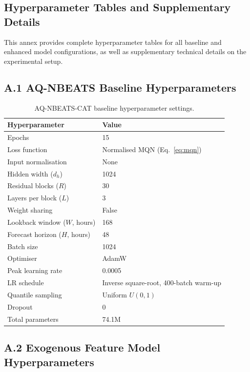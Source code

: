 \begin{center}
   \chapter{Hyperparameter Tables and Supplementary Details}
\end{center}
\label{annex:hyperparams}

\noindent
This annex provides complete hyperparameter tables for all baseline
and enhanced model configurations, as well as supplementary technical
details on the experimental setup.

\section*{A.1 AQ-NBEATS Baseline Hyperparameters}

\begin{table}[H]
\centering
\caption{AQ-NBEATS-CAT baseline hyperparameter settings.}
\label{tab:aqnbeats_hparams}
\begin{tabular}{ll}
\toprule
\textbf{Hyperparameter} & \textbf{Value} \\
\midrule
Epochs              & 15 \\
Loss function       & Normalised MQN (Eq.~\ref{eq:mqn}) \\
Input normalisation & None \\
Hidden width ($d_h$)& 1024 \\
Residual blocks ($R$) & 30 \\
Layers per block ($L$) & 3 \\
Weight sharing      & False \\
Lookback window ($W$, hours) & 168 \\
Forecast horizon ($H$, hours) & 48 \\
Batch size          & 1024 \\
Optimiser           & AdamW \\
Peak learning rate  & 0.0005 \\
LR schedule         & Inverse square-root, 400-batch warm-up \\
Quantile sampling   & Uniform $U(0,1)$ \\
Dropout             & 0 \\
Total parameters    & 74.1M \\
\bottomrule
\end{tabular}
\end{table}

\section*{A.2 Exogenous Feature Model Hyperparameters}

